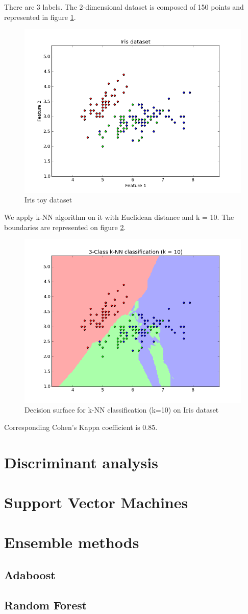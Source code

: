 \documentclass[12pt]{report}
\begin{document}
\begin{appendices}
There are 3 labels. The 2-dimensional dataset is composed of 150 points and represented in figure \ref{fig:iris_data}.

\begin{figure}[H]
\centering
\includegraphics[width=.4\textwidth]{img/appen/iris_data.png}
\caption{\label{fig:iris_data}Iris toy dataset}
\end{figure}

We apply k-NN algorithm on it with Euclidean distance and k = 10. The boundaries are represented on figure \ref{fig:iris_nn}.

\begin{figure}[H]
\centering
\includegraphics[width=.4\textwidth]{img/appen/iris_nn.png}
\caption{\label{fig:iris_nn}Decision surface for k-NN classification (k=10) on Iris dataset}
\end{figure}

Corresponding Cohen's Kappa coefficient is 0.85.

\chapter{Discriminant analysis}\label{chap:Discriminant analysis}

\chapter{Support Vector Machines}\label{chap:SVM}

\chapter{Ensemble methods}\label{chap:Ensemble methods}
\section{Adaboost}\label{section:Adaboost}
\section{Random Forest}\label{section:Random Forest}

\end{appendices}

\newpage


 

\end{document}
